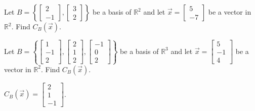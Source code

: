 \documentclass{ximera}
\begin{document}
\begin{problem}\label{prb:10.104}
Let $B = \left\{ \left[ \begin{array}{r}
2 \\
-1
\end{array} \right], \left[ \begin{array}{r}
3 \\
2
\end{array} \right] \right\}$ be a basis of $\mathbb{R}^2$ and let $\vec{x} = \left[
\begin{array}{r}
5 \\
-7
\end{array}
\right]$ be a vector in $\mathbb{R}^2$. Find $C_B(\vec{x})$.
\end{problem}

\begin{problem}\label{prb:10.105}
Let $B = \left\{ \left[ \begin{array}{r}
1 \\
-1 \\
2
\end{array} \right], \left[ \begin{array}{r}
2 \\
1 \\
2
 \end{array} \right], \left[ \begin{array}{r}
-1 \\
0 \\
2
\end{array} \right] \right\}$
be a basis of $\mathbb{R}^3$ and let $\vec{x} = \left[
\begin{array}{r}
5 \\
-1 \\
4
\end{array}
\right]$ be a vector in $\mathbb{R}^2$. Find $C_B(\vec{x})$.
\begin{hint}
 $C_B(\vec{x}) =
\left[ \begin{array}{r}
2 \\
1 \\
-1
 \end{array} \right] $.
\end{hint}
\end{problem}
\end{document}
